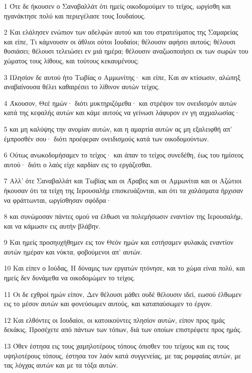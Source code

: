 \par 1 Ότε δε ήκουσεν ο Σαναβαλλάτ ότι ημείς οικοδομούμεν το τείχος, ωργίσθη και ηγανάκτησε πολύ και περιεγέλασε τους Ιουδαίους.
\par 2 Και ελάλησεν ενώπιον των αδελφών αυτού και του στρατεύματος της Σαμαρείας και είπε, Τι κάμνουσιν οι άθλιοι ούτοι Ιουδαίοι; θέλουσιν αφήσει αυτούς; θέλουσι θυσιάσει; θέλουσι τελειώσει εν μιά ημέρα; θέλουσιν αναζωοποιήσει εκ των σωρών του χώματος τους λίθους, και τούτους κεκαυμένους;
\par 3 Πλησίον δε αυτού ήτο Τωβίας ο Αμμωνίτης· και είπε, Και αν κτίσωσιν, αλώπηξ αναβαίνουσα θέλει καθαιρέσει το λίθινον αυτών τείχος.
\par 4 Άκουσον, Θεέ ημών· διότι μυκτηριζόμεθα· και στρέψον τον ονειδισμόν αυτών κατά της κεφαλής αυτών και κάμε αυτούς να γείνωσι λάφυρον εν γη αιχμαλωσίας·
\par 5 και μη καλύψης την ανομίαν αυτών, και η αμαρτία αυτών ας μη εξαλειφθή απ' έμπροσθέν σου· διότι προέφεραν ονειδισμούς κατά των οικοδομούντων.
\par 6 Ούτως ανωκοδομήσαμεν το τείχος· και άπαν το τείχος συνεδέθη, έως του ημίσεος αυτού· διότι ο λαός είχε καρδίαν εις το εργάζεσθαι.
\par 7 Αλλ' ότε Σαναβαλλάτ και Τωβίας και οι Άραβες και οι Αμμωνίται και οι Αζώτιοι ήκουσαν ότι τα τείχη της Ιερουσαλήμ επισκευάζονται, και ότι τα χαλάσματα ήρχισαν να φράττωνται, ωργίσθησαν σφόδρα·
\par 8 και συνώμοσαν πάντες ομού να έλθωσι να πολεμήσωσιν εναντίον της Ιερουσαλήμ, και να κάμωσιν εις αυτήν βλάβην.
\par 9 Και ημείς προσηυχήθημεν εις τον Θεόν ημών και εστήσαμεν φυλακάς εναντίον αυτών ημέραν και νύκτα, φοβούμενοι απ' αυτών.
\par 10 Και είπεν ο Ιούδας, Η δύναμις των εργατών ητόνησε, και το χώμα είναι πολύ, και ημείς δεν δυνάμεθα να οικοδομώμεν το τείχος.
\par 11 Οι δε εχθροί ημών είπον, Δεν θέλουσι μάθει ουδέ θέλουσιν ιδεί, εωσού έλθωμεν εις το μέσον αυτών και φονεύσωμεν αυτούς, και καταπαύσωμεν το έργον.
\par 12 Και ελθόντες οι Ιουδαίοι, οι κατοικούντες πλησίον αυτών, είπον προς ημάς δεκάκις, Προσέχετε από πάντων των τόπων, διά των οποίων επιστρέφετε προς ημάς.
\par 13 Όθεν έστησα εις τους χαμηλοτέρους τόπους όπισθεν του τείχους και εις τους υψηλοτέρους τόπους, έστησα τον λαόν κατά συγγενείας, με τας ρομφαίας αυτών, με τας λόγχας αυτών και με τα τόξα αυτών.
